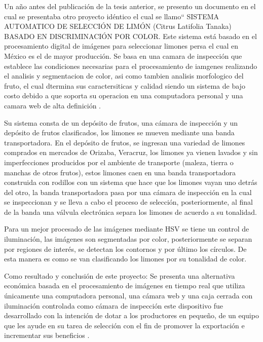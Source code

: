 Un año antes del publicación de la tesis anterior, se presento un documento en el cual se presentaba otro proyecto idéntico el cual se llamo“ SISTEMA AUTOMATICO DE SELECCIÓN DE LIMÓN (Citrus  Latifolia Tanaka) BASADO EN DISCRIMINACIÓN POR COLOR. Este sistema está basado en el procesamiento digital de imágenes para seleccionar limones persa el cual en México es el de mayor producción. Se basa en una camara de inspección que establece las condiciones necesarias para el procesamiento de iamgenes realizando el analisis y segmentacion de color, asi como tambien analisis morfologico del fruto, el cual dtermina sus caractersiticas y calidad siendo un sistema de bajo costo debido a que soporta su operacion en una computadora personal y una camara web de alta definición \cite{SistemaSeleccion}.

Su sistema consta de un depósito de frutos, una cámara de inspección y un depósito de frutos clasificados, los limones se mueven mediante una banda transportadora. En el depósito de frutos, se ingresan una variedad de limones comprados en mercados de Orizaba, Veracruz, los limones ya vienen lavados y sin imperfecciones producidos por el ambiente de transporte (maleza, tierra o manchas de otros frutos), estos limones caen en una banda transportadora construida con rodillos con un sistema que hace que los limones vayan uno detrás del otro, la banda transportadora pasa por una cámara de inspección en la cual se inspeccionan y se lleva a cabo el proceso de selección, posteriormente, al final de la banda una válvula electrónica separa los limones de acuerdo a su tonalidad.

Para un mejor procesado de las imágenes mediante HSV se tiene un control de iluminación, las imágenes son segmentadas por color, posteriormente se separan por regiones de interés, se detectan los contornos y por último los círculos. De esta manera es como se van clasificando los limones por su tonalidad de color.

Como resultado y conclusión de este proyecto: Se presenta una alternativa económica basada en el procesamiento de imágenes en tiempo real que utiliza únicamente una computadora personal, una cámara web y una caja cerrada con iluminación controlada como cámara de inspección este dispositivo fue desarrollado con la intención de dotar a los productores en pequeño, de un equipo que les ayude en su tarea de selección con el fin de promover la exportación e incrementar sus beneficios \cite{SistemaSeleccion}.

